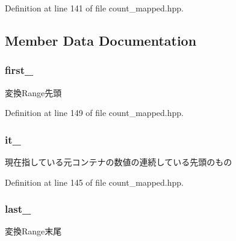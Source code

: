 \-Definition at line 141 of file count\-\_\-mapped.\-hpp.



\subsection{\-Member \-Data \-Documentation}
\hypertarget{classyuh_1_1range__detail_1_1count__map__iterator_a9296ec46eb2f6c43cf6c5263aaf54cca}{
\subsubsection[{first\-\_\-}]{ {\bf first\-\_\-}}}\label{d1/def/classyuh_1_1range__detail_1_1count__map__iterator_a9296ec46eb2f6c43cf6c5263aaf54cca}
変換\-Range先頭 

\-Definition at line 149 of file count\-\_\-mapped.\-hpp.

\hypertarget{classyuh_1_1range__detail_1_1count__map__iterator_a2946c4f061baf69bfb5b2cc1dcd80a28}{
\subsubsection[{it\-\_\-}]{ {\bf it\-\_\-}}}\label{d1/def/classyuh_1_1range__detail_1_1count__map__iterator_a2946c4f061baf69bfb5b2cc1dcd80a28}
現在指している元コンテナの数値の連続している先頭のもの 

\-Definition at line 145 of file count\-\_\-mapped.\-hpp.

\hypertarget{classyuh_1_1range__detail_1_1count__map__iterator_a9d115442fe366e570c20b178cc577690}{
\subsubsection[{last\-\_\-}]{ {\bf last\-\_\-}}}\label{d1/def/classyuh_1_1range__detail_1_1count__map__iterator_a9d115442fe366e570c20b178cc577690}
変換\-Range末尾 


